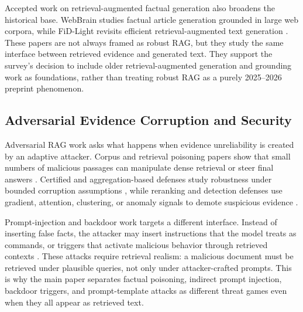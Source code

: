 \documentclass[11pt]{article}
\begin{document}
Accepted work on retrieval-augmented factual generation also broadens the historical base. WebBrain studies factual article generation grounded in large web corpora, while FiD-Light revisits efficient retrieval-augmented text generation \citep{venueExtra017,venueAcc013}. These papers are not always framed as robust RAG, but they study the same interface between retrieved evidence and generated text. They support the survey's decision to include older retrieval-augmented generation and grounding work as foundations, rather than treating robust RAG as a purely 2025--2026 preprint phenomenon.

\subsection{Adversarial Evidence Corruption and Security}

Adversarial RAG work asks what happens when evidence unreliability is created by an adaptive attacker. Corpus and retrieval poisoning papers show that small numbers of malicious passages can manipulate dense retrieval or steer final answers \citep{poisoningRetrievalCorpora2023,poisonedRAG2024,badRAG2024,rrag049,rrag057}. Certified and aggregation-based defenses study robustness under bounded corruption assumptions \citep{certifiedRAG2024,rrag016,rrag020}, while reranking and detection defenses use gradient, attention, clustering, or anomaly signals to demote suspicious evidence \citep{rrag004,rrag009,rrag011,rrag015,rrag017}.

Prompt-injection and backdoor work targets a different interface. Instead of inserting false facts, the attacker may insert instructions that the model treats as commands, or triggers that activate malicious behavior through retrieved contexts \citep{aip2025,rrag005,trojanRAG2024,phantom2024,rrag010,rrag018}. These attacks require retrieval realism: a malicious document must be retrieved under plausible queries, not only under attacker-crafted prompts. This is why the main paper separates factual poisoning, indirect prompt injection, backdoor triggers, and prompt-template attacks as different threat games even when they all appear as retrieved text.
\end{document}
